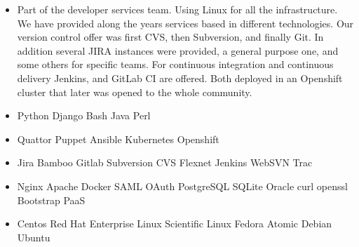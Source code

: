 \documentclass[a4paper,12pt]{memoir} %
\begin{document}
\:
\:

\begin{itemize}
    \item Part of the developer services team. Using Linux for all the infrastructure. We have provided along the years services based in different technologies. Our version control offer was first CVS, then Subversion, and finally Git. In addition several JIRA instances were provided, a general purpose one, and some others for specific teams. For continuous integration and continuous delivery Jenkins, and GitLab CI are offered. Both deployed in an Openshift cluster that later was opened to the whole community.
\end{itemize}




\Sep %


\begin{itemize}
\item Python Django Bash Java Perl
\item Quattor Puppet Ansible Kubernetes Openshift
\item Jira Bamboo Gitlab Subversion CVS Flexnet Jenkins WebSVN Trac
\item Nginx Apache Docker SAML OAuth PostgreSQL SQLite Oracle curl openssl Bootstrap PaaS
\item  Centos Red Hat Enterprise Linux Scientific Linux Fedora Atomic Debian Ubuntu
\end{itemize}

\end{document}
